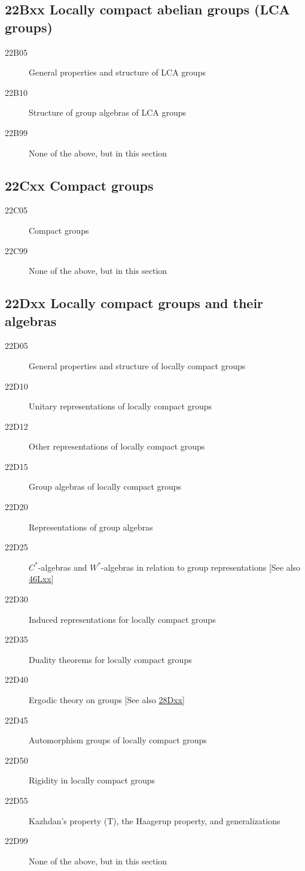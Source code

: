 \documentclass[letterpaper]{article}
\begin{document}
\subsection*{22Bxx  Locally compact abelian groups (LCA groups) }\label{22Bxx}
\begin{description}  
\item [22B05]\label{22B05} General properties and structure of LCA groups
\item [22B10]\label{22B10} Structure of group algebras of LCA groups
\item [22B99]\label{22B99} None of the above, but in this section
\end{description}
\subsection*{22Cxx  Compact groups }\label{22Cxx}
\begin{description}  
\item [22C05]\label{22C05} Compact groups
\item [22C99]\label{22C99} None of the above, but in this section
\end{description}
\subsection*{22Dxx  Locally compact groups and their algebras }\label{22Dxx}
\begin{description}  
\item [22D05]\label{22D05} General properties and structure of locally compact groups
\item [22D10]\label{22D10} Unitary representations of locally compact groups
\item [22D12]\label{22D12} Other representations of locally compact groups
\item [22D15]\label{22D15} Group algebras of locally compact groups
\item [22D20]\label{22D20} Representations of group algebras
\item [22D25]\label{22D25} $C^*$-algebras and $W^*$-algebras in relation to group representations [See also \hyperref[46Lxx]{46Lxx}]
\item [22D30]\label{22D30} Induced representations for locally compact groups
\item [22D35]\label{22D35} Duality theorems for locally compact groups
\item [22D40]\label{22D40} Ergodic theory on groups [See also \hyperref[28Dxx]{28Dxx}]
\item [22D45]\label{22D45} Automorphism groups of locally compact groups
\item [22D50]\label{22D50} Rigidity in locally compact groups
\item [22D55]\label{22D55} Kazhdan's property (T), the Haagerup property, and generalizations
\item [22D99]\label{22D99} None of the above, but in this section
\end{description}
\end{document}
